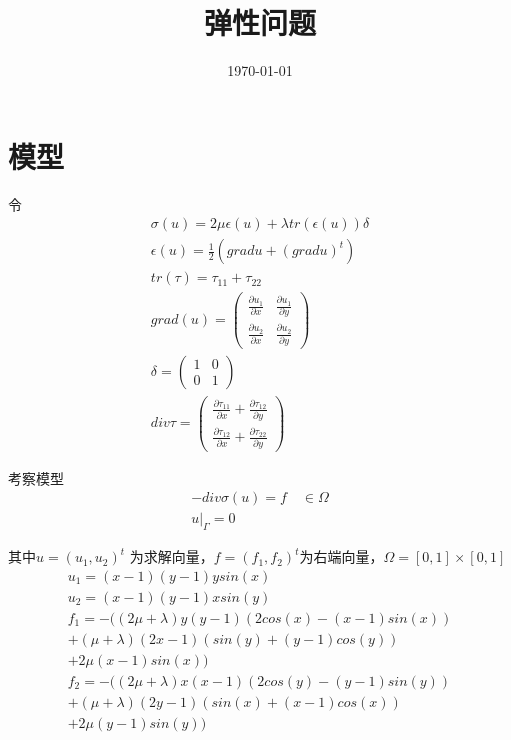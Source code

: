 \documentclass[UTF8,titlepage]{ctexart}
\title{弹性问题}
\date{\today}
\begin{document}
\maketitle

\section{模型}

令
$$
\begin{matrix}
	\sigma(u) = 2 \mu \epsilon(u) + \lambda tr(\epsilon(u)) \delta \\
	\epsilon(u) = \frac{1}{2} (grad u + (grad u)^t) \\
	tr(\tau) = \tau_{11} + \tau_{22} \\
	grad(u) = \begin{pmatrix}
		\frac{\partial u_1}{\partial x} & \frac{\partial u_1}{\partial y} \\
		\frac{\partial u_2}{\partial x} &
		\frac{\partial u_2}{\partial y}
	\end{pmatrix} \\
	\delta = \begin{pmatrix}
		1 & 0 \\
		0 & 1
	\end{pmatrix} \\
	div \tau = \begin{pmatrix}
		\frac{\partial \tau_{11}}{\partial x} + \frac{\partial \tau_{12}}{\partial y} \\
		\frac{\partial \tau_{12}}{\partial x} + \frac{\partial \tau_{22}}{\partial 
		y}
	\end{pmatrix}
\end{matrix}
$$

考察模型
$$
\begin{matrix}
	-div \sigma(u) = f \quad \in \Omega  \\
	u |_{\Gamma} = 0
\end{matrix}
$$ 
\par
其中$ u = (u_1,u_2)^t $ 为求解向量，$ f = (f_1,f_2)^t $为右端向量，$ \Omega = [0,1] \times [0,1] $
$$
\begin{matrix}
	u_1 = (x - 1)(y - 1) y sin(x) 
	\\
	u_2 = (x - 1)(y - 1) x sin(y) 
	\\
	f_1 = -((2 \mu + \lambda) y (y - 1) (2 cos(x) - (x - 1) sin(x)) \\
	+ (\mu + \lambda) (2 x - 1) (sin(y) + (y - 1) cos(y)) \\
	+ 2 \mu (x - 1) sin(x)) 
	\\
	f_2 = -((2 \mu + \lambda) x (x - 1) (2 cos(y) - (y - 1) sin(y)) \\
	+ (\mu + \lambda) (2 y - 1) (sin(x) + (x - 1) cos(x)) \\ 
	+ 2 \mu (y - 1) sin(y))
\end{matrix}
$$
\end{document}
